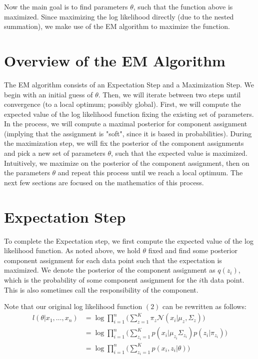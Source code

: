 \documentclass{article}
\begin{document}
Now the main goal is to find parameters $\theta$, such that the function above is maximized. Since maximizing the log likelihood directly (due to the nested summation), we make use of the EM algorithm to maximize the function.

\section{Overview of the EM Algorithm}
The EM algorithm consists of an Expectation Step and a Maximization Step. We begin with an initial guess of $\theta$. Then, we will iterate between two steps until convergence (to a local optimum; possibly global). First, we will compute the expected value of the log likelihood function fixing the existing set of parameters. In the process, we will compute a maximal posterior for component assignment (implying that the assignment is "soft", since it is based in probabilities). During the maximization step, we will fix the posterior of the component assignments and pick a new set of parameters $\theta$, such that the expected value is maximized. Intuitively, we maximize on the posterior of the component assignment, then on the parameters $\theta$ and repeat this process until we reach a local optimum. The next few sections are focused on the mathematics of this process.

\section{Expectation Step}
To complete the Expectation step, we first compute the expected value of the log likelihood function. As noted above, we hold $\theta$ fixed and find some posterior component assignment for each data point such that the expectation is maximized. We denote the posterior of the component assignment as $q(z_{i})$, which is the probability of some component assignment for the $i$th data point. This is also sometimes call the responsibility of the component.

Note that our original log likelihood function $(2)$ can be rewritten as follows:
\begin{align*}
	l(\theta | x_{1}, \ldots, x_{n})
		&= \log \prod_{i = 1}^{n} \Bigg(\sum\limits_{z = 1}^{K} \pi_{z} \mathcal{N}(x_{i} | \mu_{z}, \Sigma_{z}) \Bigg) \\
		&= \log \prod_{i = 1}^{n} \Bigg(\sum\limits_{z_{i} = 1}^{K} p(x_{i} | \mu_{z_{i}} \Sigma_{z_{i}}) p(z_{i} | \pi_{z_{i}}) \Bigg) \\
		&= \log \prod\limits_{i = 1}^{n} \Bigg(\sum\limits_{z_{i} = 1}^{K} p(x_{i}, z_{i} | \theta) \Bigg) \\
\end{align*}
\end{document}
